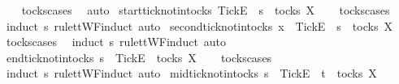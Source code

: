 \begin{isabellebody}
%
\isadelimproof
\ \ %
\endisadelimproof
%
\isatagproof
{}\isamarkupfalse%
\ tocks{\isachardot}cases\ \isamarkupfalse%
\ {\isacharparenleft}auto{\isacharparenright}%
\endisatagproof
{\isafoldproof}%
%
\isadelimproof
\isanewline
%
\endisadelimproof
\isanewline
{}\isamarkupfalse%
\ start{\isacharunderscore}tick{\isacharunderscore}notin{\isacharunderscore}tocks{\isacharcolon}\ {\isachardoublequoteopen}{\isacharbrackleft}Tick{\isacharbrackright}\isactrlsub E\ {\isacharhash}\ s\ {\isasymnotin}\ tocks\ X{\isachardoublequoteclose}\isanewline
%
\isadelimproof
\ \ %
\endisadelimproof
%
\isatagproof
{}\isamarkupfalse%
\ tocks{\isachardot}cases\ \isamarkupfalse%
\ {\isacharparenleft}induct\ s\ rule{\isacharcolon}ttWF{\isachardot}induct{\isacharcomma}\ auto{\isacharparenright}%
\endisatagproof
{\isafoldproof}%
%
\isadelimproof
\isanewline
%
\endisadelimproof
\isanewline
{}\isamarkupfalse%
\ second{\isacharunderscore}tick{\isacharunderscore}notin{\isacharunderscore}tocks{\isacharcolon}\ {\isachardoublequoteopen}x\ {\isacharhash}\ {\isacharbrackleft}Tick{\isacharbrackright}\isactrlsub E\ {\isacharhash}\ s\ {\isasymnotin}\ tocks\ X{\isachardoublequoteclose}\isanewline
%
\isadelimproof
\ \ %
\endisadelimproof
%
\isatagproof
{}\isamarkupfalse%
\ tocks{\isachardot}cases\ \isamarkupfalse%
\ {\isacharparenleft}induct\ s\ rule{\isacharcolon}ttWF{\isachardot}induct{\isacharcomma}\ auto{\isacharparenright}%
\endisatagproof
{\isafoldproof}%
%
\isadelimproof
\isanewline
%
\endisadelimproof
\isanewline
{}\isamarkupfalse%
\ end{\isacharunderscore}tick{\isacharunderscore}notin{\isacharunderscore}tocks{\isacharcolon}\ {\isachardoublequoteopen}s\ {\isacharat}\ {\isacharbrackleft}{\isacharbrackleft}Tick{\isacharbrackright}\isactrlsub E{\isacharbrackright}\ {\isasymnotin}\ tocks\ X{\isachardoublequoteclose}\isanewline
%
\isadelimproof
\ \ %
\endisadelimproof
%
\isatagproof
{}\isamarkupfalse%
\ tocks{\isachardot}cases\ \isamarkupfalse%
\ {\isacharparenleft}induct\ s\ rule{\isacharcolon}ttWF{\isachardot}induct{\isacharcomma}\ auto{\isacharparenright}%
\endisatagproof
{\isafoldproof}%
%
\isadelimproof
\isanewline
%
\endisadelimproof
\isanewline
{}\isamarkupfalse%
\ mid{\isacharunderscore}tick{\isacharunderscore}notin{\isacharunderscore}tocks{\isacharcolon}\ {\isachardoublequoteopen}s\ {\isacharat}\ {\isacharbrackleft}{\isacharbrackleft}Tick{\isacharbrackright}\isactrlsub E{\isacharbrackright}\ {\isacharat}\ t\ {\isasymnotin}\ tocks\ X{\isachardoublequoteclose}\isanewline

\end{isabellebody}
